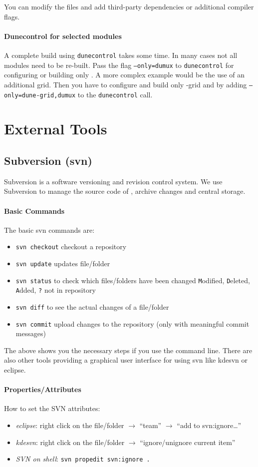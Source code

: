 You can modify the files and add third-party dependencies or additional compiler flags.

\paragraph{Dunecontrol for selected modules}
A complete build using \texttt{dunecontrol} takes some time. In many cases not all modules need to be re-built.
Pass the flag \texttt{--only=dumux} to \texttt{dunecontrol} for configuring or building only \Dumux. A more
complex example would be the use of an additional grid. Then you have to configure and build only \Dune{}-grid
and \Dumux by adding \texttt{--only=dune-grid,dumux} to the \texttt{dunecontrol} call.

\section{External Tools}
\subsection{Subversion (svn)}

Subversion is a software versioning and revision control system. We use Subversion to manage the source code
of \Dumux, archive changes and central storage.

\paragraph{Basic Commands}
The basic svn commands are:
\begin{itemize}
  \item \texttt{svn checkout} checkout a repository
  \item \texttt{svn update} updates file/folder
  \item \texttt{svn status} to check which files/folders have been changed
        \texttt{M}odified, \texttt{D}eleted, \texttt{A}dded, \texttt{?} not in repository
  \item \texttt{svn diff} to see the actual changes of a file/folder
  \item \texttt{svn commit} upload changes to the repository (only with meaningful
        commit messages)
\end{itemize}
The above shows you the necessary steps if you use the command line. There are also other tools providing a graphical 
user interface for using svn like kdesvn or eclipse.

\paragraph{Properties/Attributes}
How to set the SVN attributes:
\begin{itemize}
 \item{\em eclipse}: right click on the file/folder $\rightarrow$ ``team''
        $\rightarrow$ ``add to svn:ignore\dots''
 \item{\em kdesvn}: right click on the file/folder $\rightarrow$ ``ignore/unignore
        current item''
 \item{\em SVN on shell}: \verb+svn propedit svn:ignore .+
\end{itemize}

